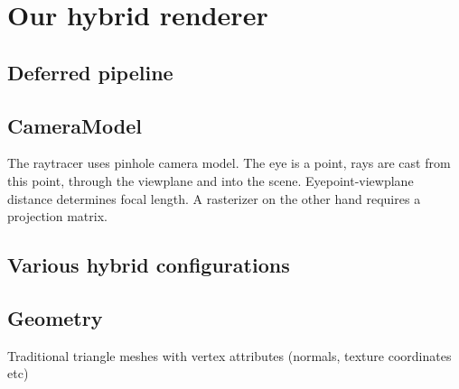 \section{Our hybrid renderer}


\subsection{Deferred pipeline}

\subsection{CameraModel}
The raytracer uses pinhole camera model. The eye is a point, rays are cast from this point, through the viewplane and into the scene. Eyepoint-viewplane distance determines focal length. A rasterizer on the other hand requires a projection matrix.

\subsection{Various hybrid configurations}

\subsection{Geometry}

Traditional triangle meshes with vertex attributes (normals, texture coordinates etc)


